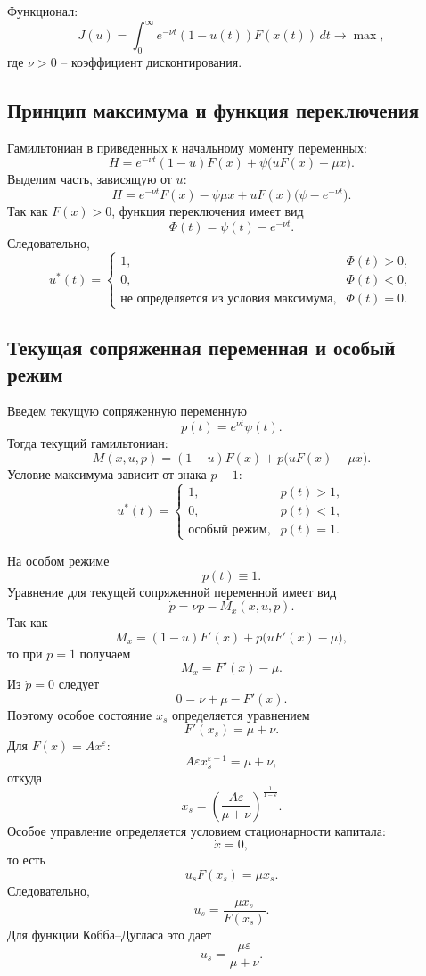 \documentclass[12pt,a4paper]{article}
\newcommand{\eps}{\varepsilon}
\begin{document}
Функционал:
\[
    J(u)=\int_0^\infty e^{-\nu t}(1-u(t))F(x(t))\,dt\to\max,
\]
где \(\nu>0\) -- коэффициент дисконтирования.

\subsection{Принцип максимума и функция переключения}

Гамильтониан в приведенных к начальному моменту переменных:
\[
    H=e^{-\nu t}(1-u)F(x)+\psi\bigl(uF(x)-\mu x\bigr).
\]
Выделим часть, зависящую от \(u\):
\[
    H=e^{-\nu t}F(x)-\psi\mu x+uF(x)\bigl(\psi-e^{-\nu t}\bigr).
\]
Так как \(F(x)>0\), функция переключения имеет вид
\[
    \Phi(t)=\psi(t)-e^{-\nu t}.
\]
Следовательно,
\[
    u^*(t)=
    \begin{cases}
        1, & \Phi(t)>0,\\
        0, & \Phi(t)<0,\\
        \text{не определяется из условия максимума}, & \Phi(t)=0.
    \end{cases}
\]

\subsection{Текущая сопряженная переменная и особый режим}

Введем текущую сопряженную переменную
\[
    p(t)=e^{\nu t}\psi(t).
\]
Тогда текущий гамильтониан:
\[
    M(x,u,p)=(1-u)F(x)+p\bigl(uF(x)-\mu x\bigr).
\]
Условие максимума зависит от знака \(p-1\):
\[
    u^*(t)=
    \begin{cases}
        1, & p(t)>1,\\
        0, & p(t)<1,\\
        \text{особый режим}, & p(t)=1.
    \end{cases}
\]

На особом режиме
\[
    p(t)\equiv1.
\]
Уравнение для текущей сопряженной переменной имеет вид
\[
    \dot p=\nu p-M_x(x,u,p).
\]
Так как
\[
    M_x=(1-u)F'(x)+p\bigl(uF'(x)-\mu\bigr),
\]
то при \(p=1\) получаем
\[
    M_x=F'(x)-\mu.
\]
Из \(\dot p=0\) следует
\[
    0=\nu+\mu-F'(x).
\]
Поэтому особое состояние \(x_s\) определяется уравнением
\[
    F'(x_s)=\mu+\nu.
\]
Для \(F(x)=Ax^\eps\):
\[
    A\eps x_s^{\eps-1}=\mu+\nu,
\]
откуда
\[
    x_s=\left(\frac{A\eps}{\mu+\nu}\right)^{\frac{1}{1-\eps}}.
\]
Особое управление определяется условием стационарности капитала:
\[
    \dot x=0,
\]
то есть
\[
    u_sF(x_s)=\mu x_s.
\]
Следовательно,
\[
    u_s=\frac{\mu x_s}{F(x_s)}.
\]
Для функции Кобба--Дугласа это дает
\[
    u_s=\frac{\mu\eps}{\mu+\nu}.
\]
\end{document}
